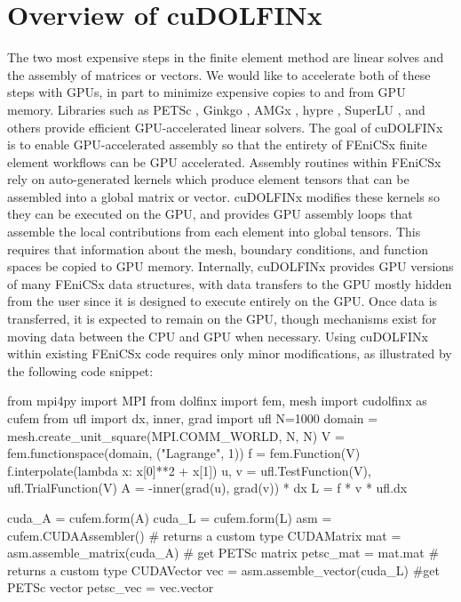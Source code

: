\section*{Overview of cuDOLFINx}

The two most expensive steps in the finite element method are linear solves and the assembly of matrices or vectors. We would like to accelerate both of these steps with GPUs, in part to minimize expensive copies to and from GPU memory. Libraries such as PETSc \citep{MILLS2021102831},  Ginkgo \citep{ginkgo-toms-2022}, AMGx \citep{naumov2015amgx}, hypre \citep{li2020efficient, falgout2021porting}, SuperLU \citep{li2023newly}, and others \citep{lu2023tilesptrsv} provide efficient GPU-accelerated linear solvers. The goal of cuDOLFINx is to enable GPU-accelerated assembly so that the entirety of FEniCSx finite element workflows can be GPU accelerated. Assembly routines within FEniCSx rely on auto-generated kernels which produce element tensors that can be assembled into a global matrix or vector. cuDOLFINx modifies these kernels so they can be executed on the GPU, and provides GPU assembly loops that assemble the local contributions from each element into global tensors. This requires that information about the mesh, boundary conditions, and function spaces be copied to GPU memory. Internally, cuDOLFINx provides GPU versions of many FEniCSx data structures, with data transfers to the GPU mostly hidden from the user since it is designed to execute entirely on the GPU. Once data is transferred, it is expected to remain on the GPU, though mechanisms exist for moving data between the CPU and GPU when necessary. Using cuDOLFINx within existing FEniCSx code requires only minor modifications, as illustrated by the following code snippet:

\begin{python}
from mpi4py import MPI
from dolfinx import fem, mesh
import cudolfinx as cufem
from ufl import dx, inner, grad
import ufl
N=1000
domain = mesh.create_unit_square(MPI.COMM_WORLD, N, N)
V = fem.functionspace(domain, ("Lagrange", 1))
f = fem.Function(V)
f.interpolate(lambda x: x[0]**2 + x[1])
u, v = ufl.TestFunction(V), ufl.TrialFunction(V) 
A = -inner(grad(u), grad(v)) * dx
L = f * v * ufl.dx 

cuda_A = cufem.form(A)
cuda_L = cufem.form(L)
asm = cufem.CUDAAssembler()
# returns a custom type CUDAMatrix
mat = asm.assemble_matrix(cuda_A)
# get PETSc matrix
petsc_mat = mat.mat
# returns a custom type CUDAVector
vec = asm.assemble_vector(cuda_L)
#get PETSc vector
petsc_vec = vec.vector
\end{python}

